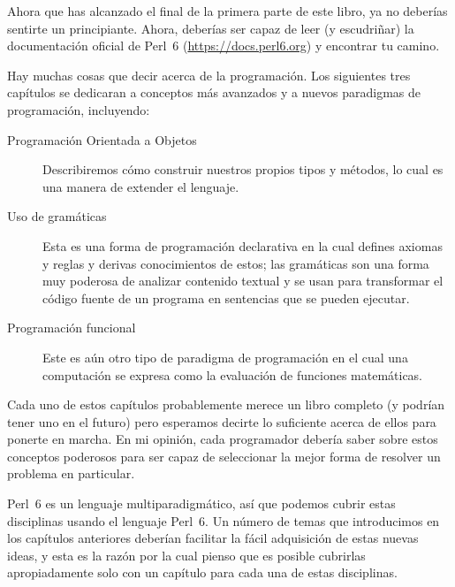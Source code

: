 %

Ahora que has alcanzado el final de la primera parte 
de este libro, ya no deberías sentirte un principiante.
Ahora, deberías ser capaz de leer (y escudriñar) la 
documentación oficial de Perl~6 (\url{https://docs.perl6.org})
y encontrar tu camino.

Hay muchas cosas que decir acerca de la programación.
Los siguientes tres capítulos se dedicaran a conceptos
más avanzados y a nuevos paradigmas de programación,
incluyendo:
\begin{description}

\item[Programación Orientada a Objetos] Describiremos 
cómo construir nuestros propios tipos y métodos, lo cual
es una manera de extender el lenguaje.

\item[Uso de gramáticas] Esta es una forma de programación
declarativa en la cual defines axiomas y reglas y derivas
conocimientos de estos; las gramáticas son una forma muy
poderosa de analizar contenido textual y se usan para 
transformar el código fuente de un programa en sentencias
que se pueden ejecutar.

\item[Programación funcional] Este es aún otro tipo de paradigma 
de programación en el cual una computación se expresa como
la evaluación de funciones matemáticas.
\end{description}

Cada uno de estos capítulos probablemente merece un
libro completo (y podrían tener uno en el futuro) 
pero esperamos decirte lo suficiente acerca
de ellos para ponerte en marcha. En mi opinión,
cada programador debería saber sobre estos conceptos 
poderosos para ser capaz de seleccionar la mejor forma
de resolver un problema en particular.

Perl~6 es un lenguaje multiparadigmático, así que 
podemos cubrir estas disciplinas usando el lenguaje Perl~6.
Un número de temas que introducimos en los
capítulos anteriores deberían facilitar la fácil
adquisición de estas nuevas ideas, y esta es la 
razón por la cual pienso que es posible cubrirlas
apropiadamente solo con un capítulo para cada una de
estas disciplinas.

